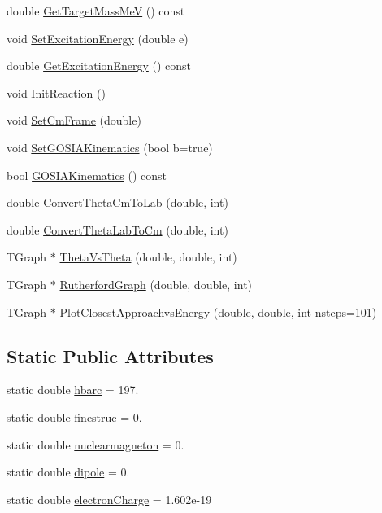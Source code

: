 \begin{DoxyCompactItemize}
double \hyperlink{classReaction_a3f53916a2f5cedbdca7ef3496d940a29}{Get\-Target\-Mass\-Me\-V} () const 
\item 
void \hyperlink{classReaction_a844b83a9925e350f2de77c17bdf0a71f}{Set\-Excitation\-Energy} (double e)
\item 
double \hyperlink{classReaction_abf75a7c4f579ef30b8397779fe8add84}{Get\-Excitation\-Energy} () const 
\item 
void \hyperlink{classReaction_aa36161ccf8b40d608e96bfbf47bc5f38}{Init\-Reaction} ()
\item 
void \hyperlink{classReaction_a7bb2c8c05ec7099774042b495761c344}{Set\-Cm\-Frame} (double)
\item 
void \hyperlink{classReaction_ad9e6f9701b6c0f29ef05e4ae007d2c27}{Set\-G\-O\-S\-I\-A\-Kinematics} (bool b=true)
\item 
bool \hyperlink{classReaction_aa15a2f2000c54e1a5bcb5e6231b20a02}{G\-O\-S\-I\-A\-Kinematics} () const 
\item 
double \hyperlink{classReaction_aa0749dc9eb4a46e051bab88aab3ab10d}{Convert\-Theta\-Cm\-To\-Lab} (double, int)
\item 
double \hyperlink{classReaction_a1201e1afefe6cc09db1c96faf398f318}{Convert\-Theta\-Lab\-To\-Cm} (double, int)
\item 
T\-Graph $\ast$ \hyperlink{classReaction_a5a1d393bace0a9c11b77769f020d34e2}{Theta\-Vs\-Theta} (double, double, int)
\item 
T\-Graph $\ast$ \hyperlink{classReaction_a5be6997bfd61ea2a3cb14efdb72d3b45}{Rutherford\-Graph} (double, double, int)
\item 
T\-Graph $\ast$ \hyperlink{classReaction_a0eaf4784bc0fb9c15ea2cbf5c74fd70f}{Plot\-Closest\-Approachvs\-Energy} (double, double, int nsteps=101)
\end{DoxyCompactItemize}
\subsection*{Static Public Attributes}
\begin{DoxyCompactItemize}
\item 
static double \hyperlink{classReaction_a7312a47fadc4fd628d408a672a7c1249}{hbarc} = 197.
\item 
static double \hyperlink{classReaction_ae5cded739cd4c1b07a79a850c3d83b21}{finestruc} = 0.
\item 
static double \hyperlink{classReaction_adbeaf76ca988330f57ccf5479284c51d}{nuclearmagneton} = 0.
\item 
static double \hyperlink{classReaction_a726225b505e6bad7ee271fd1165e1318}{dipole} = 0.
\item 
static double \hyperlink{classReaction_ac1a709b13c8bb45fd259d7bda61343a9}{electron\-Charge} = 1.\-602e-\/19
\end{DoxyCompactItemize}


